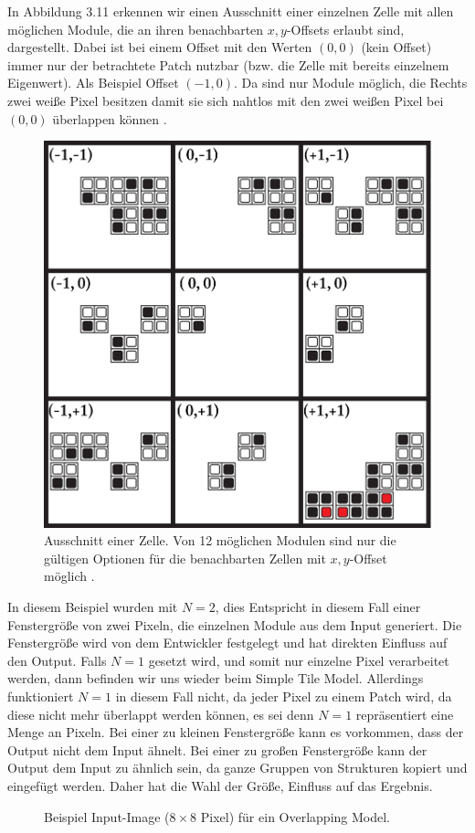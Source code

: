 \documentclass[12pt, a4paper,twoside,openright]{report} %
\begin{document}
In Abbildung 3.11 erkennen wir einen Ausschnitt einer einzelnen Zelle mit allen möglichen Module, die an ihren benachbarten $x,y$-Offsets erlaubt sind, dargestellt.
Dabei ist bei einem Offset mit den Werten $(0,0)$ {(kein Offset)} immer nur der betrachtete Patch nutzbar {(bzw. die Zelle mit bereits einzelnem Eigenwert)}.
Als Beispiel Offset $(-1,0)$. Da sind nur Module möglich, die Rechts zwei weiße Pixel besitzen damit sie sich nahtlos mit den zwei weißen Pixel bei $(0,0)$ überlappen können \cite{Karth2017WaveFunctionCollapseIC}.

\begin{figure}[H]
    \centering
    \includegraphics[width=0.5\linewidth]{images/red-maze-offset-example.png}%
    \caption{Ausschnitt einer Zelle. Von 12 möglichen Modulen sind nur die gültigen Optionen für die benachbarten Zellen mit $x,y$-Offset möglich \cite{Karth2017WaveFunctionCollapseIC}.}%
\end{figure}

In diesem Beispiel wurden mit $N = 2$, dies Entspricht in diesem Fall einer Fenstergröße von zwei Pixeln, die einzelnen Module aus dem Input generiert.
Die Fenstergröße wird von dem Entwickler festgelegt und hat direkten Einfluss auf den Output.
Falls $N = 1$ gesetzt wird, und somit nur einzelne Pixel verarbeitet werden, dann befinden wir uns wieder beim Simple Tile Model.
Allerdings funktioniert $N = 1$ in diesem Fall nicht, da jeder Pixel zu einem Patch wird, da diese nicht mehr überlappt werden können,
es sei denn $N = 1$ repräsentiert eine Menge an Pixeln.
Bei einer zu kleinen Fenstergröße kann es vorkommen, dass der Output nicht dem Input ähnelt.
Bei einer zu großen Fenstergröße kann der Output dem Input zu ähnlich sein, da ganze Gruppen von Strukturen kopiert und eingefügt werden.
Daher hat die Wahl der Größe, Einfluss auf das Ergebnis.

\begin{figure}[H]
    \centering
    \caption{Beispiel Input-Image ($8\times8$ Pixel) für ein Overlapping Model.}%
\end{figure}
\end{document}
